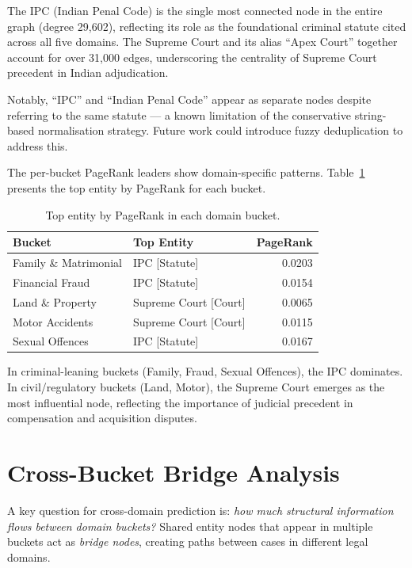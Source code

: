 The IPC (Indian Penal Code) is the single most connected node in the entire graph (degree 29,602), reflecting its role as the foundational criminal statute cited across all five domains. The Supreme Court and its alias ``Apex Court'' together account for over 31,000 edges, underscoring the centrality of Supreme Court precedent in Indian adjudication.

Notably, ``IPC'' and ``Indian Penal Code'' appear as separate nodes despite referring to the same statute — a known limitation of the conservative string-based normalisation strategy. Future work could introduce fuzzy deduplication to address this.

The per-bucket PageRank leaders show domain-specific patterns. Table~\ref{tab:pagerank-by-bucket} presents the top entity by PageRank for each bucket.

\begin{table}[H]
\centering
\caption{Top entity by PageRank in each domain bucket.}
\label{tab:pagerank-by-bucket}
\begin{tabular}{@{}llr@{}}
\toprule
\textbf{Bucket} & \textbf{Top Entity} & \textbf{PageRank} \\
\midrule
Family \& Matrimonial  & IPC [Statute]                    & 0.0203 \\
Financial Fraud        & IPC [Statute]                    & 0.0154 \\
Land \& Property       & Supreme Court [Court]            & 0.0065 \\
Motor Accidents        & Supreme Court [Court]            & 0.0115 \\
Sexual Offences        & IPC [Statute]                    & 0.0167 \\
\bottomrule
\end{tabular}
\end{table}

In criminal-leaning buckets (Family, Fraud, Sexual Offences), the IPC dominates. In civil/regulatory buckets (Land, Motor), the Supreme Court emerges as the most influential node, reflecting the importance of judicial precedent in compensation and acquisition disputes.

\section{Cross-Bucket Bridge Analysis}
\label{sec:cross-bridge}

A key question for cross-domain prediction is: \emph{how much structural information flows between domain buckets?} Shared entity nodes that appear in multiple buckets act as \emph{bridge nodes}, creating paths between cases in different legal domains.

